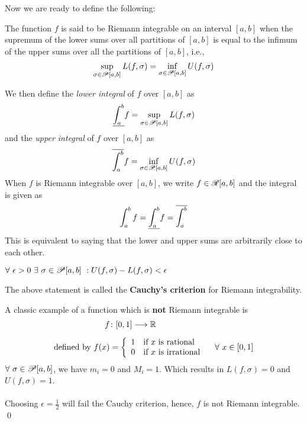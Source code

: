 \documentclass[a4paper]{book}
\begin{document}
\newpage
\noindent Now we are ready to define the following:
\begin{definition}
The function $f$ is said to be Riemann integrable on an interval $[a,b]$ when the supremum of the lower sums over all partitions of $[a,b]$ is equal to the infimum of the upper sums over all the partitions of $[a,b]$, i.e., 
\begin{align*}
\sup_{\sigma \in \mathscr{P}[a,b]} L(f, \sigma) = \inf_{\sigma \in \mathscr{P}[a,b]} U(f, \sigma)
\end{align*}
\end{definition}
\noindent We then define the {\em lower integral} of $f$ over $[a,b]$ as \[ \displaystyle \underline{\int_{a}^{b}} f = \sup_{\sigma \in \mathscr{P}[a,b]} L(f, \sigma) \]
and the {\em upper integral} of $f$ over $[a,b]$ as \[\displaystyle \overline{\int_{a}^{b}} f = \inf_{\sigma \in \mathscr{P}[a,b]} U(f, \sigma)\]
When $f$ is Riemann integrable over $[a,b]$, we write $f \in \mathscr{R}[a,b]$ and the integral is given as \[ \int_a^b f = \underline{\int_{a}^{b}} f = \overline{\int_{a}^{b}} \]
This is equivalent to saying that the lower and upper sums are arbitrarily close to each other. 
\begin{definition}
$\forall\ \epsilon>0\ \exists\ \sigma \in \mathscr{P}[a,b]\ : U(f,\sigma) - L(f,\sigma) < \epsilon$
\end{definition}
\noindent The above statement is called the {\bf Cauchy's criterion} for Riemann integrability. 
\begin{exampleT}
A classic example of a function which is {\bf not} Riemann integrable is 
\begin{align*}
f&\colon [0,1] \longrightarrow \mathbb{R}  \\[5pt]
\text{defined by } f(x) &= \left\lbrace \begin{array}{l l}
1 & \text{if $x$ is rational} \\
0 & \text{if $x$ is irrational}
\end{array} \right.\quad \forall\ x \in [0,1]
\end{align*}
$\forall\ \sigma\in \mathscr{P}[a,b]$, we have $m_i =0$ and $M_i = 1$. Which results in $L(f, \sigma) = 0$ and $U(f, \sigma) = 1$. \\ \\ Choosing $\epsilon = \frac{1}{2}$ will fail the Cauchy criterion, hence, $f$ is not Riemann integrable. \qed
\end{exampleT}
\end{document}
